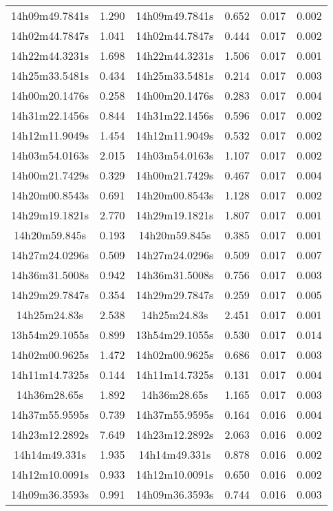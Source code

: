 \begin{table}
\begin{tabular}{cccccc}
14h09m49.7841s & 1.290 & 14h09m49.7841s & 0.652 & 0.017 & 0.002 \\
14h02m44.7847s & 1.041 & 14h02m44.7847s & 0.444 & 0.017 & 0.002 \\
14h22m44.3231s & 1.698 & 14h22m44.3231s & 1.506 & 0.017 & 0.001 \\
14h25m33.5481s & 0.434 & 14h25m33.5481s & 0.214 & 0.017 & 0.003 \\
14h00m20.1476s & 0.258 & 14h00m20.1476s & 0.283 & 0.017 & 0.004 \\
14h31m22.1456s & 0.844 & 14h31m22.1456s & 0.596 & 0.017 & 0.002 \\
14h12m11.9049s & 1.454 & 14h12m11.9049s & 0.532 & 0.017 & 0.002 \\
14h03m54.0163s & 2.015 & 14h03m54.0163s & 1.107 & 0.017 & 0.002 \\
14h00m21.7429s & 0.329 & 14h00m21.7429s & 0.467 & 0.017 & 0.004 \\
14h20m00.8543s & 0.691 & 14h20m00.8543s & 1.128 & 0.017 & 0.002 \\
14h29m19.1821s & 2.770 & 14h29m19.1821s & 1.807 & 0.017 & 0.001 \\
14h20m59.845s & 0.193 & 14h20m59.845s & 0.385 & 0.017 & 0.001 \\
14h27m24.0296s & 0.509 & 14h27m24.0296s & 0.509 & 0.017 & 0.007 \\
14h36m31.5008s & 0.942 & 14h36m31.5008s & 0.756 & 0.017 & 0.003 \\
14h29m29.7847s & 0.354 & 14h29m29.7847s & 0.259 & 0.017 & 0.005 \\
14h25m24.83s & 2.538 & 14h25m24.83s & 2.451 & 0.017 & 0.001 \\
13h54m29.1055s & 0.899 & 13h54m29.1055s & 0.530 & 0.017 & 0.014 \\
14h02m00.9625s & 1.472 & 14h02m00.9625s & 0.686 & 0.017 & 0.003 \\
14h11m14.7325s & 0.144 & 14h11m14.7325s & 0.131 & 0.017 & 0.004 \\
14h36m28.65s & 1.892 & 14h36m28.65s & 1.165 & 0.017 & 0.003 \\
14h37m55.9595s & 0.739 & 14h37m55.9595s & 0.164 & 0.016 & 0.004 \\
14h23m12.2892s & 7.649 & 14h23m12.2892s & 2.063 & 0.016 & 0.002 \\
14h14m49.331s & 1.935 & 14h14m49.331s & 0.878 & 0.016 & 0.002 \\
14h12m10.0091s & 0.933 & 14h12m10.0091s & 0.650 & 0.016 & 0.002 \\
14h09m36.3593s & 0.991 & 14h09m36.3593s & 0.744 & 0.016 & 0.003 \\

\end{tabular}
\end{table}
